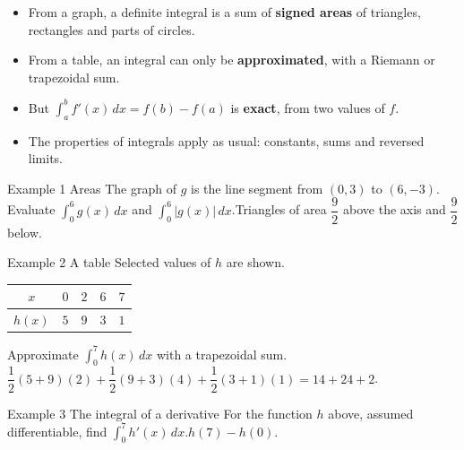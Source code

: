 \documentclass[11pt]{article}
\begin{document}

\begin{ideabox}
\begin{itemize}[leftmargin=*,itemsep=2pt,topsep=2pt]
  \item From a graph, a definite integral is a sum of \textbf{signed areas} of triangles, rectangles and parts of circles.
  \item From a table, an integral can only be \textbf{approximated}, with a Riemann or trapezoidal sum.
  \item But $\displaystyle\int_{a}^{b}f'(x)\,dx=f(b)-f(a)$ is \textbf{exact}, from two values of $f$.
  \item The properties of integrals apply as usual: constants, sums and reversed limits.
\end{itemize}
\end{ideabox}

\begin{example}{Example 1 \textperiodcentered{} Areas}
The graph of $g$ is the line segment from $(0,3)$ to $(6,-3)$. Evaluate $\displaystyle\int_{0}^{6}g(x)\,dx$ and $\displaystyle\int_{0}^{6}|g(x)|\,dx$.\soln Triangles of area $\dfrac92$ above the axis and $\dfrac92$ below.
\end{example}

\begin{example}{Example 2 \textperiodcentered{} A table}
Selected values of $h$ are shown.\begin{center}\renewcommand{\arraystretch}{1.25}\begin{tabular}{|c|c|c|c|c|}\hline $x$ & $0$ & $2$ & $6$ & $7$ \\ \hline $h(x)$ & $5$ & $9$ & $3$ & $1$ \\ \hline\end{tabular}\end{center}Approximate $\displaystyle\int_{0}^{7}h(x)\,dx$ with a trapezoidal sum.\soln $\dfrac12(5+9)(2)+\dfrac12(9+3)(4)+\dfrac12(3+1)(1)=14+24+2$.
\end{example}

\begin{example}{Example 3 \textperiodcentered{} The integral of a derivative}
For the function $h$ above, assumed differentiable, find $\displaystyle\int_{0}^{7}h'(x)\,dx$.\soln $h(7)-h(0)$.
\end{example}
\end{document}
